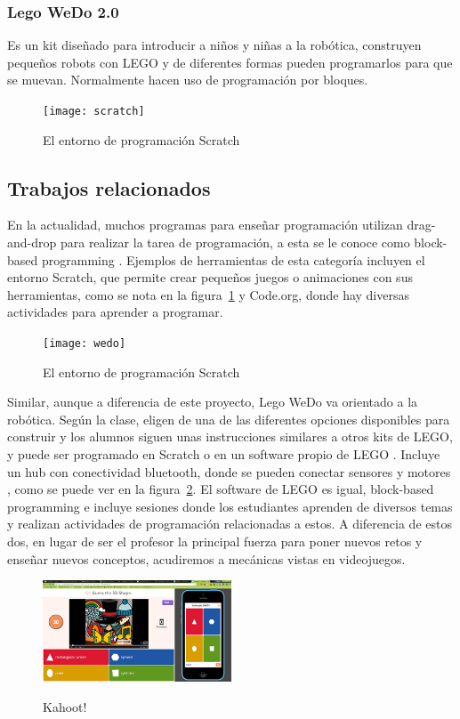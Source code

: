 \subsubsection{Lego WeDo 2.0}
Es un kit diseñado para introducir a niños y niñas a la robótica, 
construyen pequeños robots con LEGO y de diferentes 
formas pueden programarlos para que se muevan. 
Normalmente hacen uso de programación por bloques.

\begin{figure}[ht]
    \centering
    \texttt{[image: scratch]}
    \caption{El entorno de programación Scratch}
    \label{fig:scratch_scrn}
\end{figure}

\subsection{Trabajos relacionados}
En la actualidad, muchos programas para enseñar programación utilizan 
drag-and-drop para realizar la tarea de programación, 
a esta se le conoce como block-based programming \cite{block_based_programming}. 
Ejemplos de herramientas de esta categoría incluyen el entorno Scratch, 
que permite crear pequeños juegos o animaciones con sus herramientas, 
como se nota en la figura~\ref{fig:scratch_scrn} y Code.org, donde hay diversas actividades 
para aprender a programar.

\begin{figure}[ht]
    \centering
    \texttt{[image: wedo]}
    \label{fig:wedo_kit}
    \caption{El entorno de programación Scratch}
\end{figure}

Similar, aunque a diferencia de este proyecto, Lego WeDo va orientado a la robótica. Según la clase, eligen de una de las diferentes opciones disponibles para construir y los alumnos siguen unas instrucciones similares a otros kits de LEGO, y puede ser programado en Scratch o en un software propio de LEGO \cite{lego_wedo_explanation}. Incluye un hub con conectividad bluetooth, donde se pueden conectar sensores y motores \cite{lego_wedo_site}, como se puede ver en la figura~\ref{fig:wedo_kit}. El software de LEGO es igual, block-based programming e incluye sesiones donde los estudiantes aprenden de diversos temas y realizan actividades de programación relacionadas a estos. A diferencia de estos dos, en lugar de ser el profesor la principal fuerza para poner nuevos retos y enseñar nuevos conceptos, acudiremos a mecánicas vistas en videojuegos.

\begin{figure}[ht]
    \centering
    \includegraphics[width=0.5\textwidth]{images/kahoot.png}
    \label{fig:kahoot}
    \caption{Kahoot!}
\end{figure}

